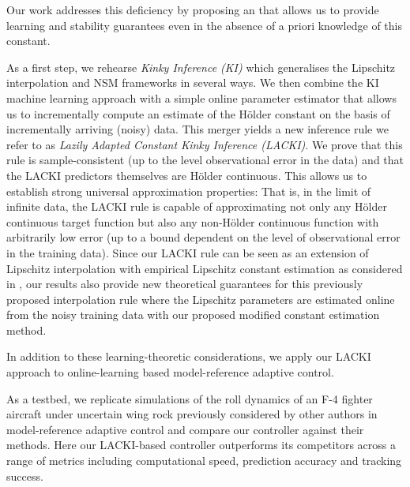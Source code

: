 Our work addresses this deficiency by proposing an that allows us to provide learning and stability guarantees even in the absence of a priori knowledge of this constant.

 As a first step, we rehearse \emph{Kinky Inference (KI)} \cite{calliess2014_thesis} which generalises the Lipschitz interpolation and NSM frameworks in several ways.
%
We then combine the KI machine learning approach with a simple online parameter estimator that allows us to incrementally compute an estimate of the H\"older constant on the basis of incrementally arriving (noisy) data. This merger yields a new inference rule we refer to as \emph{Lazily Adapted Constant Kinky Inference (LACKI)}. We prove that this rule is sample-consistent (up to the level observational error in the data) and that the LACKI predictors themselves are H\"older continuous. This allows us to establish strong universal approximation properties: That is, in the limit of infinite data, the LACKI rule is capable of approximating not only any H\"older continuous target function but also any non-H\"older continuous function with arbitrarily low error (up to a bound dependent on the level of observational error in the training data). Since our LACKI rule can be seen as an extension of Lipschitz interpolation with empirical Lipschitz constant estimation as considered in \cite{Beliakov2006}, our results also provide new theoretical guarantees for this previously proposed interpolation rule where the Lipschitz parameters are estimated online from the noisy training data with our proposed modified constant estimation method.

In addition to these learning-theoretic considerations, we apply our LACKI approach to online-learning based model-reference adaptive control.

 As a testbed, we replicate simulations of  the roll dynamics of an F-4 fighter aircraft under uncertain wing rock previously considered by other authors in model-reference adaptive control \cite{Chowdhary2013,Monahemi1996,chowdharyacc2013} and compare our controller against their methods. Here our LACKI-based controller outperforms its competitors across a range of metrics including computational speed, prediction accuracy and tracking success. 

